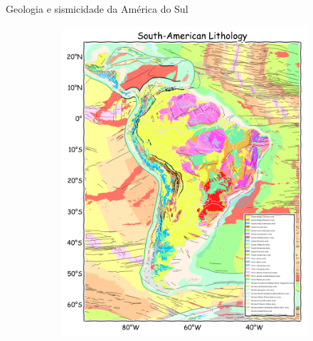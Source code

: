 \documentclass[ucs,8pt]{beamer}
\begin{document}
\begin{frame}{Geologia e sismicidade da América do Sul}
\begin{figure}[H]
	\centering
	\begin{subfigure}[t]{0.48\textwidth}
	  \centering
	  \includegraphics[width=.85\textwidth]{lithology_sa} 
	  \label{fig:sa_tec} 
	\end{subfigure}
	\quad %
	\begin{subfigure}[t]{0.48\textwidth}
	  \centering

\end{subfigure}
\end{figure}
\end{frame}
\end{document}
